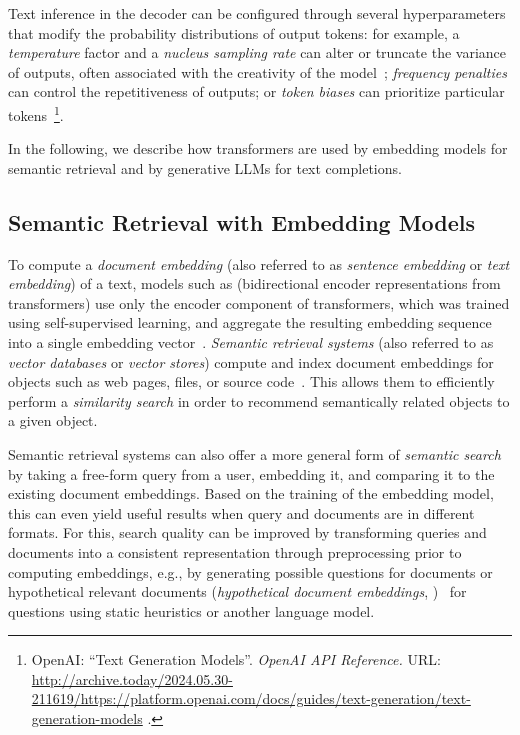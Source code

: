 \begin{description}[noextralabelsep]
	Text inference in the decoder can be configured through several hyperparameters that modify the probability distributions of output tokens:
	for example, a \emph{temperature} factor and a \emph{nucleus sampling rate} can alter or truncate the variance of outputs, often associated with the creativity of the model~\cite{holtzman2020curious}; \emph{frequency penalties} can control the repetitiveness of outputs; or \emph{token biases} can prioritize particular tokens~\footnote{
		OpenAI: ``Text Generation Models''. \emph{OpenAI API Reference.} URL:
		\url{http://archive.today/2024.05.30-211619/https://platform.openai.com/docs/guides/text-generation/text-generation-models}%
		.
	}.
\end{description}

In the following, we describe how transformers are used by embedding models for semantic retrieval and by generative LLMs for text completions.

\subsection{Semantic Retrieval with Embedding Models}
\label{sec:background/semtec/retrieval}

To compute a \emph{document embedding} (also referred to as \emph{sentence embedding} or \emph{text embedding}) of a text, models such as  (bidirectional encoder representations from transformers) %
use only the encoder component of transformers, which was trained using self-supervised learning, and aggregate the resulting embedding sequence into a single embedding vector~\cite{devlin2019bert,raffel2023exploring}.
\emph{Semantic retrieval systems} (also referred to as \emph{vector databases} or \emph{vector stores}) compute and index document embeddings for objects such as web pages, files, or source code~\cite{lewis2020retrieval}.
This allows them to efficiently perform a \emph{similarity search} in order to recommend semantically related objects to a given object.

Semantic retrieval systems can also offer a more general form of \emph{semantic search} by taking a free-form query from a user, embedding it, and comparing it to the existing document embeddings.
Based on the training of the embedding model, this can even yield useful results when query and documents are in different formats.
For this, search quality can be improved by transforming queries and documents into a consistent representation through preprocessing prior to computing embeddings, e.g., by generating possible questions for documents or hypothetical relevant documents (\emph{hypothetical document embeddings}, )~\cite{mao2021generation,gao2022precise} for questions using static heuristics or another language model.

